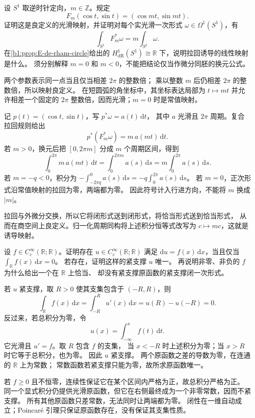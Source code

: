 \begin{exercise}\label{b1:ex:E-circle-covering}
设 \(S^1\) 取逆时针定向，\(m\in\mathbb Z\)。规定
\[
 F_m(\cos t,\sin t)=(\cos mt,\sin mt).
\]
证明这是良定义的光滑映射，并证明对每个实光滑一次形式
\(\omega\in\Omega^1(S^1)\)，有
\[
 \int_{S^1}F_m^*\omega=m\int_{S^1}\omega.
\]
在\cref{b1:prop:E-de-rham-circle}给出的
\(H^1_{\mathrm{dR}}(S^1)\cong\mathbb R\) 下，说明拉回诱导的线性映射是什么。
须分别解释 \(m=0\) 和 \(m<0\)，不能把结论仅当作微分同胚的换元公式。
\end{exercise}
\begin{solution}
两个参数表示同一点当且仅当相差 \(2\pi\) 的整数倍；
乘以整数 \(m\) 后仍相差 \(2\pi\) 的整数倍，所以映射良定义。
在短圆弧的角坐标中，其坐标表达局部为 \(t\mapsto mt\)
并允许相差一个固定的 \(2\pi\) 整数倍，因而光滑；\(m=0\) 时是常值映射。

记 \(p(t)=(\cos t,\sin t)\)，写 \(p^*\omega=a(t)\,\mathrm dt\)，
其中 \(a\) 光滑且 \(2\pi\) 周期。复合拉回规则给出
\[
 p^*(F_m^*\omega)=m\,a(mt)\,\mathrm dt.
\]
若 \(m>0\)，换元后把 \([0,2\pi m]\) 分成 \(m\) 个周期区间，得到
\[
 \int_0^{2\pi}m\,a(mt)\,\mathrm dt
 =\int_0^{2\pi m}a(s)\,\mathrm ds
 =m\int_0^{2\pi}a(s)\,\mathrm ds.
\]
若 \(m=-q<0\)，积分为
\(-\int_{-2\pi q}^0a(s)\,\mathrm ds=-q\int_0^{2\pi}a(s)\,\mathrm ds\)。
若 \(m=0\)，正次形式沿常值映射的拉回为零，两端都为零。
因此符号计入行进方向，不能将 \(m\) 换成 \(|m|\)。

拉回与外微分交换，所以它将闭形式送到闭形式，将恰当形式送到恰当形式，
从而在商空间上良定义。归一化周期同构将上述积分恒等式改写为
\(c\mapsto mc\)，这就是诱导映射。
\end{solution}

\begin{exercise}\label{b1:ex:E-compact-primitive-line}
设 \(f\in C_c^\infty(\mathbb R;\mathbb R)\)。证明存在
\(u\in C_c^\infty(\mathbb R;\mathbb R)\) 满足
\(\mathrm du=f(x)\,\mathrm dx\)，当且仅当
\(\int_{\mathbb R}f(x)\,\mathrm dx=0\)。
若存在，证明这样的紧支撑 \(u\) 唯一。
再说明非零、非负的 \(f\) 为什么给出一个在 \(\mathbb R\) 上恰当、
却没有紧支撑原函数的紧支撑闭一次形式。
\end{exercise}
\begin{solution}
若 \(u\) 紧支撑，取 \(R>0\) 使其支集包含于 \((-R,R)\)，则
\[
 \int_{\mathbb R}f(x)\,\mathrm dx
 =\int_{-R}^Ru'(x)\,\mathrm dx=u(R)-u(-R)=0.
\]
反过来，若总积分为零，令
\[
 u(x)=\int_{-\infty}^x f(t)\,\mathrm dt.
\]
它光滑且 \(u'=f\)。取 \(R\) 包含 \(f\) 的支集，
当 \(x<-R\) 时上述积分为零；当 \(x>R\) 时它等于总积分，也为零。
因此 \(u\) 紧支撑。
两个原函数之差的导数为零，在连通的 \(\mathbb R\) 上为常数；
常数函数若紧支撑只能为零，故所求原函数唯一。

若 \(f\geq0\) 且不恒零，连续性保证它在某个区间内严格为正，故总积分严格为正。
同一个显式积分仍提供光滑原函数，但它在右侧最终成为一个非零常数，因而不紧支撑。
所有其他原函数只差常数，无法同时让两端都为零。
闭性在一维自动成立；Poincaré 引理只保证原函数存在，没有保证其支集性质。
\end{solution}

